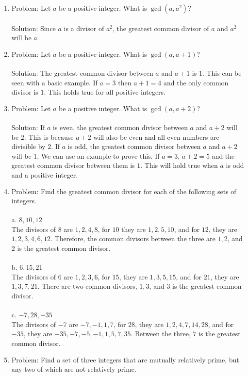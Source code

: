 \documentclass[]{article}
\begin{document}
\begin{enumerate}
    \item Problem: Let $a$ be a positive integer. What is $\gcd(a, a^2)$?
    \\\\ Solution: Since $a$ is a divisor of $a^2$, the greatest common divisor of $a$ and $a^2$ will be $a$
    \item Problem: Let $a$ be a positive integer. What is $\gcd(a, a+1)$?
    \\\\ Solution: The greatest common divisor between $a$ and $a+1$ is $1$. This can be seen with a basic example. If $a=3$ then $a+1=4$ and the only common divisor is $1$. This holds true for all positive integers.
    \item Problem: Let $a$ be a positive integer. What is $\gcd(a, a+2)$?
    \\\\ Solution: If $a$ is even, the greatest common divisor between $a$ and $a+2$ will be $2$. This is because $a+2$ will also be even and all even numbers are divisible by $2$. If $a$ is odd, the greatest common divisor between $a$ and $a+2$ will be $1$. We can use an example to prove this. If $a=3$, $a+2=5$ and the greatest common divisor between them is $1$. This will hold true when $a$ is odd and a positive integer.
    \item Problem: Find the greatest common divisor for each of the following sets of integers.
    \\\\ a. $8,10,12$
    \\ The divisors of $8$ are $1,2,4,8$, for $10$ they are $1,2,5,10$, and for $12$, they are $1,2,3,4,6,12$. Therefore, the common divisors between the three are $1,2$, and $2$ is the greatest common divisor.
    \\\\ b. $6,15,21$
    \\ The divisors of $6$ are $1,2,3,6$, for $15$, they are $1,3,5,15$, and for $21$, they are $1,3,7,21$. There are two common divisors, $1,3$, and $3$ is the greatest common divisor.
    \\\\ c. $-7,28,-35$
    \\ The divisors of $-7$ are $-7,-1,1,7$, for $28$, they are $1,2,4,7,14,28$, and for $-35$, they are $-35,-7,-5,-1,1,5,7,35$. Between the three, $7$ is the greatest common divisor.
    \item Problem: Find a set of three integers that are mutually relatively prime, but any two of which are not relatively prime.

\end{enumerate}
\end{document}
